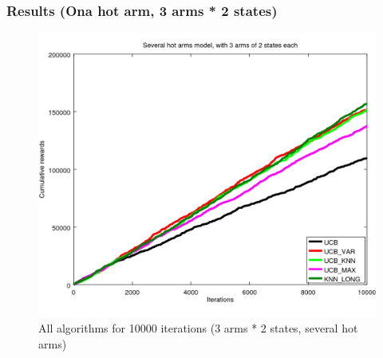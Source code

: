 \documentclass[french]{beamer}
\begin{document}
\begin{frame}
	\frametitle{Results (Ona hot arm, 3 arms * 2 states)}
		
	\begin{figure}[h]
		\begin{center}
			\includegraphics[width=1.0\textwidth]{all_m_10000it.png}
		\end{center}
		\caption{All algorithms for 10000 iterations (3 arms * 2 states, several hot arms)}
	\end{figure}
	

\end{frame}
\end{document}
